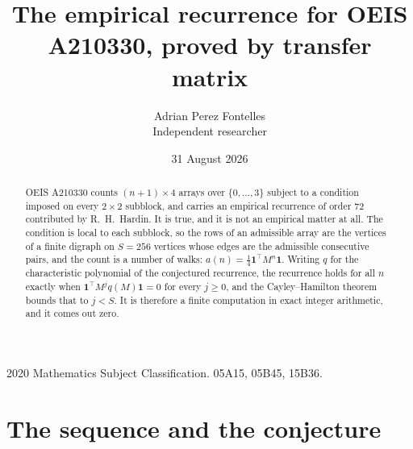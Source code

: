 \documentclass[11pt,a4paper]{article}
\title{The empirical recurrence for OEIS A210330, proved by transfer matrix}
\author{Adrian Perez Fontelles\\ \small Independent researcher}
\date{31 August 2026}
\theoremstyle{plain}
\theoremstyle{definition}
\begin{document}
\maketitle

\begin{abstract}
OEIS A210330 counts $(n+1)\times4$ arrays over $\{0,\dots,3\}$ subject to a condition imposed on
every $2\times2$ subblock, and carries an empirical recurrence of order $72$ contributed
by R.~H.~Hardin. It is true, and it is not an empirical matter at all. The condition is local
to each subblock, so the rows of an admissible array are the vertices of a finite digraph
on $S=256$ vertices whose edges are the admissible consecutive pairs, and the count is a
number of walks: $a(n)=\tfrac1{4}\mathbf{1}^{\!\top}M^{n}\mathbf{1}$. Writing $q$
for the characteristic polynomial of the conjectured recurrence, the recurrence holds for all
$n$ exactly when $\mathbf{1}^{\!\top}M^{j}q(M)\mathbf{1}=0$ for every $j\ge0$, and the
Cayley--Hamilton theorem bounds that to $j<S$. It is therefore a finite computation in exact
integer arithmetic, and it comes out zero.
\end{abstract}

\noindent\small 2020 Mathematics Subject Classification. 05A15, 05B45, 15B36.\normalsize

\section{The sequence and the conjecture}
\end{document}
